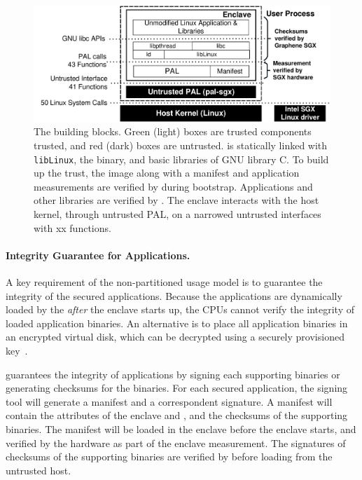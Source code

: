 \begin{figure}[t!]
\centering
\includegraphics[width=5in]{graphene-sgx/figures/architecture.pdf}
\footnotesize
\caption[The \sysname{} building blocks]
{The \sysname{} building blocks.
Green (light) boxes are trusted components trusted,
and red (dark) boxes are untrusted.
\sysname{} is statically linked with {\tt libLinux},
the \libos{} binary, and basic libraries of GNU library C.
To build up the trust, the \sysname{} image along with
a manifest and application measurements
are verified by \sgx{} during bootstrap. Applications and other libraries
are verified by \sysname{}. The enclave interacts with the host kernel,
through untrusted PAL, on a narrowed untrusted interfaces with xx functions.}
\label{fig:gsgx:arch}
\end{figure}

\paragraph{Integrity Guarantee for Applications.}
A key requirement of the non-partitioned usage model is to guarantee the integrity of the secured applications.
Because the applications are dynamically loaded by the \libos{}
{\em after} the enclave starts up,
the CPUs cannot verify the integrity of loaded application binaries.
An alternative is to place all application binaries in an encrypted virtual disk,
which can be decrypted using a securely provisioned key~\citep{baumann14haven}.

\sysname{} guarantees the integrity of applications
by signing each supporting binaries or generating checksums for the binaries.
For each secured application, the \sysname{} signing tool will generate
a manifest and a correspondent signature.
A manifest will contain the attributes of the enclave and \libos{},
and the checksums of the supporting binaries.
The manifest will be loaded in the enclave before the enclave starts,
and verified by the hardware as part of the enclave measurement.
The signatures of checksums of the supporting binaries
are verified by \sysname{} before loading from the untrusted host.

